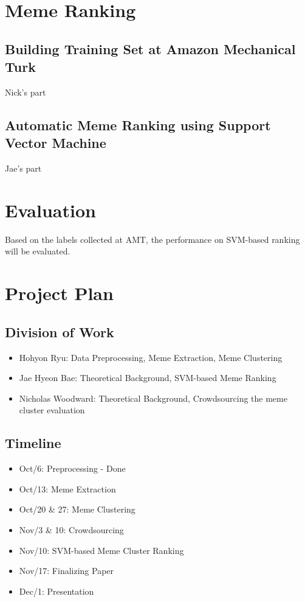 \documentclass{sig-alternate}
\begin{document}
\section{Meme Ranking}

\subsection{Building Training Set at Amazon Mechanical Turk}

Nick's part

\subsection{Automatic Meme Ranking using Support Vector Machine}

Jae's part


\section{Evaluation}

Based on the labels collected at AMT, the performance on SVM-based ranking will be evaluated.

\section{Project Plan}

\subsection{Division of Work}

\begin{itemize}
\item Hohyon Ryu: Data Preprocessing, Meme Extraction, Meme Clustering
\item Jae Hyeon Bae: Theoretical Background, SVM-based Meme Ranking
\item Nicholas Woodward: Theoretical Background, Crowdsourcing the meme cluster evaluation
\end{itemize}

\subsection{Timeline}


\begin{itemize}
  \item Oct/6: Preprocessing - Done
  \item Oct/13: Meme Extraction
  \item Oct/20 \& 27: Meme Clustering
  \item Nov/3 \& 10: Crowdsourcing 
  \item Nov/10: SVM-based Meme Cluster Ranking
  \item Nov/17: Finalizing Paper
  \item Dec/1: Presentation
\end{itemize}


%

\end{document}
